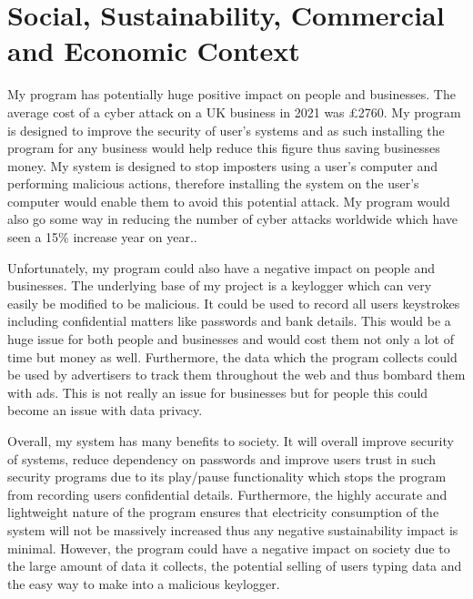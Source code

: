 \documentclass[10pt,a4paper]{report}
\begin{document}
\section{Social, Sustainability, Commercial and Economic Context}

My program has potentially huge positive impact on people and businesses. The average cost of a cyber attack on a UK business in 2021 was £2760\cite{o'dea_2022}. My program is designed to improve the security of user's systems and as such installing the program for any business would help reduce this figure thus saving businesses money. My system is designed to stop imposters using a user's computer and performing malicious actions, therefore installing the system on the user's computer would enable them to avoid this potential attack. My program would also go some way in reducing the number of cyber attacks worldwide which have seen a 15\% increase year on year.\cite{karafiloski_2021}. 

Unfortunately, my program could also have a negative impact on people and businesses. The underlying base of my project is a keylogger which can very easily be modified to be malicious. It could be used to record all users keystrokes including confidential matters like passwords and bank details. This would be a huge issue for both people and businesses and would cost them not only a lot of time but money as well. Furthermore, the data which the program collects could be used by advertisers to track them throughout the web and thus bombard them with ads. This is not really an issue for businesses but for people this could become an issue with data privacy. 

Overall, my system has many benefits to society. It will overall improve security of systems, reduce dependency on passwords and improve users trust in such security programs due to its play/pause functionality which stops the program from recording users confidential details. Furthermore, the highly accurate and lightweight nature of the program ensures that electricity consumption of the system will not be massively increased thus any negative sustainability impact is minimal. However, the program could have a negative impact on society due to the large amount of data it collects, the potential selling of users typing data and the easy way to make into a malicious keylogger. 
\end{document}
